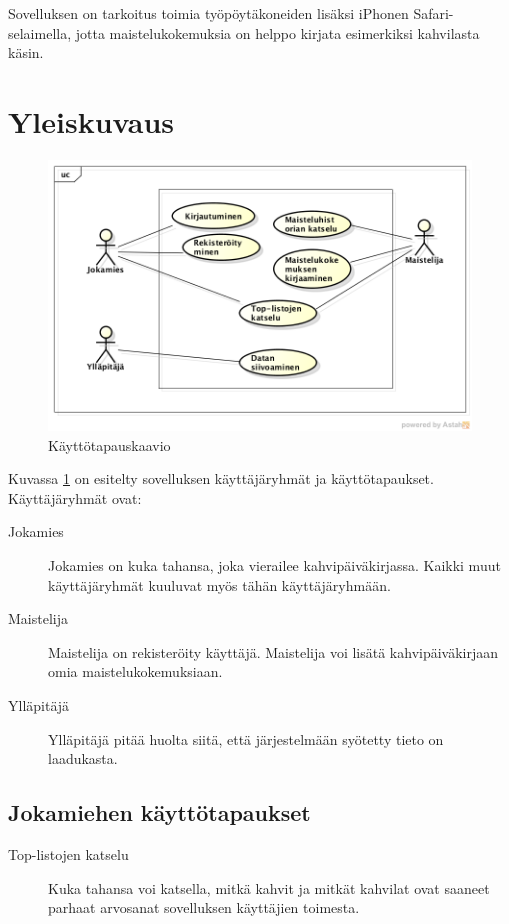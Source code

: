 \documentclass[a4paper,titlepage]{article}
\begin{document}
Sovelluksen on tarkoitus toimia työpöytäkoneiden lisäksi iPhonen
Safari-selaimella, jotta maistelukokemuksia on helppo kirjata
esimerkiksi kahvilasta käsin.

\section{Yleiskuvaus}

\begin{figure}[ht]
  \caption{Käyttötapauskaavio}
  \label{fig:käyttötapaus}
  \includegraphics[width=12cm]{usecase}
\end{figure}

Kuvassa \ref{fig:käyttötapaus} on esitelty sovelluksen käyttäjäryhmät
ja käyttötapaukset. Käyttäjäryhmät ovat:

\begin{description}
\item[Jokamies] Jokamies on kuka tahansa, joka vierailee
  kahvipäiväkirjassa. Kaikki muut käyttäjäryhmät kuuluvat myös tähän
  käyttäjäryhmään.

\item[Maistelija] Maistelija on rekisteröity käyttäjä. Maistelija voi
  lisätä kahvipäiväkirjaan omia maistelukokemuksiaan.

\item[Ylläpitäjä] Ylläpitäjä pitää huolta siitä, että järjestelmään
  syötetty tieto on laadukasta.
\end{description}

\subsection{Jokamiehen käyttötapaukset}

\begin{description}
\item[Top-listojen katselu] Kuka tahansa voi katsella, mitkä kahvit ja
  mitkät kahvilat ovat saaneet parhaat arvosanat sovelluksen
  käyttäjien toimesta.
\end{description}
\end{document}
